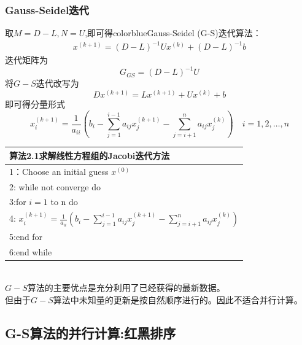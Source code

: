 \documentclass[12pt,a4paper]{article}
\begin{document}
\subsubsection{Gauss-Seidel迭代}
取$M=D-L,N=U$,即可得{color{blue}Gauss-Seidel (G-S)迭代}算法：
\begin{align}
x^{(k+1)}=(D-L)^{-1} U x^{(k)}+(D-L)^{-1} b\tag{6.9}
\end{align}
迭代矩阵为
$$
G_{GS}=(D-L)^{-1}U
$$
将$G-S$迭代改写为
$$
Dx^{(k+1)}=Lx^{(k+1)}+Ux^{(k)}+b
$$
即可得分量形式
$$
x_{i}^{(k+1)}=\frac{1}{a_{i i}}\left(b_{i}-\sum_{j=1}^{i-1} a_{i j} x_{j}^{(k+1)}-\sum_{j=i+1}^{n} a_{i j} x_{j}^{(k)}\right) \quad i=1,2, \ldots, n
$$
\begin{tabular}{l}
\hline
{\color{blue}算法2.1}求解线性方程组的Jacobi迭代方法\\
\hline
1：Choose an initial guess $x^{(0)}$\\
2: while not converge do\\
3:\qquad for $i=1$ to n do\\
4:\qquad \qquad
$x_{i}^{(k+1)}=\frac{1}{a_{i i}}\left(b_{i}-\sum_{j=1}^{i-1} a_{i j} x_{j}^{(k+1)}-\sum_{j=i+1}^{n} a_{i j} x_{j}^{(k)}\right)$\\
5:\qquad end for\\
6:end while\\
\hline
\end{tabular}\\
$G-S$算法的主要优点是充分利用了已经获得的最新数据。\\
但由于$G-S$算法中未知量的更新是按自然顺序进行的。因此不适合并行计算。\\
\subsection*{G-S算法的并行计算:红黑排序}
\end{document}

